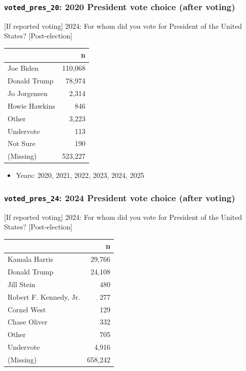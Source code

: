 \documentclass[10pt,article,oneside]{memoir}
\begin{document}
\subsubsection{\texorpdfstring{\texttt{voted\_pres\_20}: 2020 President
vote choice (after
voting)}{voted\_pres\_20: 2020 President vote choice (after voting)}}\label{voted_pres_20-2020-president-vote-choice-after-voting}

{[}If reported voting{]} 2024: For whom did you vote for President of
the United States? {[}Post-election{]}

\begin{table}[H]
\centering
\begin{tabular}[t]{lr}
\toprule
 & n\\
\midrule
Joe Biden & 110,068\\
Donald Trump & 78,974\\
Jo Jorgensen & 2,314\\
Howie Hawkins & 846\\
Other & 3,223\\
Undervote & 113\\
Not Sure & 190\\
(Missing) & 523,227\\
\bottomrule
\end{tabular}
\end{table}

\begin{itemize}
\tightlist
\item
  Years: 2020, 2021, 2022, 2023, 2024, 2025
\end{itemize}

\subsubsection{\texorpdfstring{\texttt{voted\_pres\_24}: 2024 President
vote choice (after
voting)}{voted\_pres\_24: 2024 President vote choice (after voting)}}\label{voted_pres_24-2024-president-vote-choice-after-voting}

{[}If reported voting{]} 2024: For whom did you vote for President of
the United States? {[}Post-election{]}

\begin{table}[H]
\centering
\begin{tabular}[t]{lr}
\toprule
 & n\\
\midrule
Kamala Harris & 29,766\\
Donald Trump & 24,108\\
Jill Stein & 480\\
Robert F. Kennedy, Jr. & 277\\
Cornel West & 129\\
Chase Oliver & 332\\
Other & 705\\
Undervote & 4,916\\
(Missing) & 658,242\\
\bottomrule
\end{tabular}
\end{table}
\end{document}
